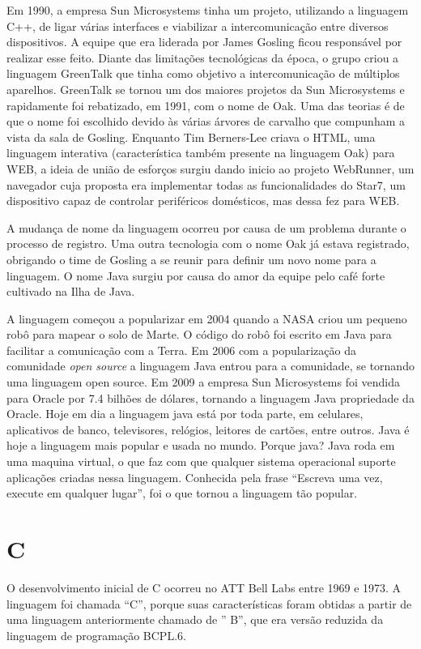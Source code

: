 \documentclass[
    12pt,               %
    openany,            %
    twoside,            %
    a4paper,            %
    brazil              %
    ]{abntex2}
\begin{document}
Em 1990, a empresa Sun Microsystems tinha um projeto, utilizando a linguagem
C++, de ligar várias interfaces e viabilizar a intercomunicação entre diversos
dispositivos.  A equipe que era liderada por James Gosling ficou responsável
por realizar esse feito. Diante das limitações tecnológicas da época, o grupo
criou a linguagem GreenTalk que tinha como objetivo a intercomunicação de
múltiplos aparelhos.  GreenTalk se tornou um dos maiores projetos da Sun
Microsystems e rapidamente foi rebatizado, em 1991, com o nome de Oak. Uma das
teorias é de que o nome foi escolhido devido às várias árvores de carvalho que
compunham a vista da sala de Gosling. Enquanto Tim Berners-Lee criava o HTML,
uma linguagem interativa (característica também presente na linguagem Oak) para
WEB, a ideia de união de esforços surgiu dando inicio ao projeto WebRunner, um
navegador cuja proposta era implementar todas as funcionalidades do Star7, um
dispositivo capaz de controlar periféricos domésticos, mas dessa fez para WEB.

A mudança de nome da linguagem ocorreu por causa de um problema durante o
processo de registro.  Uma outra tecnologia com o nome Oak já estava
registrado, obrigando o time de Gosling a se reunir para definir um novo nome
para a linguagem. O nome Java surgiu por causa do amor da equipe pelo café
forte cultivado na Ilha de Java. 

A linguagem começou a popularizar em 2004 quando a NASA criou um pequeno robô
para mapear o solo de Marte. O código do robô foi escrito em Java para
facilitar a comunicação com a Terra. Em 2006 com a popularização da comunidade
\textit{open source} a linguagem Java entrou para a comunidade, se tornando uma
linguagem open source.  Em 2009 a empresa Sun Microsystems foi vendida para
Oracle por 7.4 bilhões de dólares, tornando a linguagem Java propriedade da
Oracle. Hoje em dia a linguagem java está por toda parte, em celulares,
aplicativos de banco, televisores, relógios, leitores de cartões, entre outros.
Java é hoje a linguagem mais popular e usada no mundo.  Porque java?  Java roda
em uma maquina virtual, o que faz com que qualquer sistema operacional suporte
aplicações criadas nessa linguagem. Conhecida pela frase “Escreva uma vez,
execute em qualquer lugar”, foi o que tornou a linguagem tão popular.

\chapter{C}

O desenvolvimento inicial de C ocorreu no ATT Bell Labs entre 1969 e 1973. A
linguagem foi chamada “C”, porque suas características foram obtidas a partir
de uma linguagem anteriormente chamado de ” B”, que era versão reduzida da
linguagem de programação BCPL.6.
\end{document}
